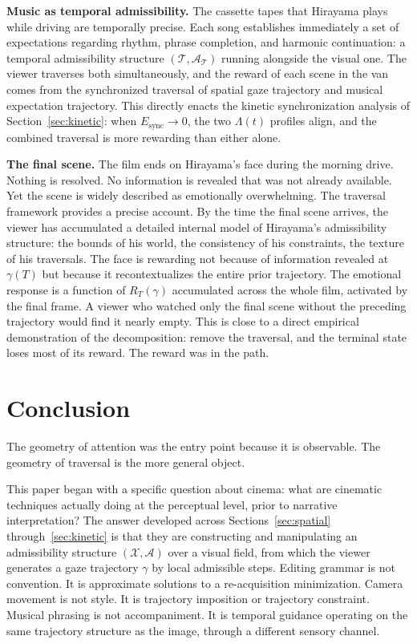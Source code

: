 \documentclass[12pt, a4paper]{article}
\theoremstyle{plain}
\theoremstyle{definition}
\theoremstyle{remark}
\newcommand{\X}{\mathcal{X}}
\newcommand{\A}{\mathcal{A}}
\newcommand{\traj}{\gamma}
\newcommand{\reward}{R}
\begin{document}
\medskip
\noindent\textbf{Music as temporal admissibility.} The
cassette tapes that Hirayama plays while driving are
temporally precise. Each song establishes immediately a
set of expectations regarding rhythm, phrase completion,
and harmonic continuation: a temporal admissibility
structure $(\mathcal{T}, \A_{\mathcal{T}})$ running
alongside the visual one. The viewer traverses both
simultaneously, and the reward of each scene in the van
comes from the synchronized traversal of spatial gaze
trajectory and musical expectation trajectory. This
directly enacts the kinetic synchronization analysis of
Section~\ref{sec:kinetic}: when $E_{\mathrm{sync}} \to 0$,
the two $\Lambda(t)$ profiles align, and the combined
traversal is more rewarding than either alone.

\medskip
\noindent\textbf{The final scene.} The film ends on
Hirayama's face during the morning drive. Nothing is
resolved. No information is revealed that was not already
available. Yet the scene is widely described as emotionally
overwhelming. The traversal framework provides a precise
account. By the time the final scene arrives, the viewer
has accumulated a detailed internal model of Hirayama's
admissibility structure: the bounds of his world, the
consistency of his constraints, the texture of his
traversals. The face is rewarding not because of
information revealed at $\traj(T)$ but because it
recontextualizes the entire prior trajectory. The emotional
response is a function of $\reward_T(\traj)$ accumulated
across the whole film, activated by the final frame.
A viewer who watched only the final scene without the
preceding trajectory would find it nearly empty. This is
close to a direct empirical demonstration of the
decomposition: remove the traversal, and the terminal state
loses most of its reward. The reward was in the path.

\section{Conclusion}
\label{sec:conclusion}

The geometry of attention was the entry point because it is
observable. The geometry of traversal is the more general
object.

This paper began with a specific question about cinema: what
are cinematic techniques actually doing at the perceptual
level, prior to narrative interpretation? The answer
developed across Sections~\ref{sec:spatial}
through~\ref{sec:kinetic} is that they are constructing and
manipulating an admissibility structure $(\X, \A)$ over a
visual field, from which the viewer generates a gaze
trajectory $\traj$ by local admissible steps. Editing
grammar is not convention. It is approximate solutions to a
re-acquisition minimization. Camera movement is not style.
It is trajectory imposition or trajectory constraint.
Musical phrasing is not accompaniment. It is temporal
guidance operating on the same trajectory structure as the
image, through a different sensory channel.
\end{document}
